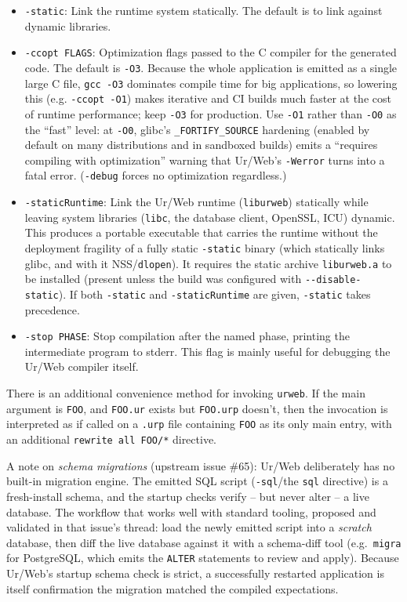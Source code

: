 \documentclass{article}
\begin{document}
\begin{itemize}
\item \texttt{-static}: Link the runtime system statically.  The default is to link against dynamic libraries.

\item \texttt{-ccopt FLAGS}: Optimization flags passed to the C compiler for the generated code.  The default is \texttt{-O3}.  Because the whole application is emitted as a single large C file, \texttt{gcc -O3} dominates compile time for big applications, so lowering this (e.g. \texttt{-ccopt -O1}) makes iterative and CI builds much faster at the cost of runtime performance; keep \texttt{-O3} for production.  Use \texttt{-O1} rather than \texttt{-O0} as the ``fast'' level: at \texttt{-O0}, glibc's \texttt{\_FORTIFY\_SOURCE} hardening (enabled by default on many distributions and in sandboxed builds) emits a ``requires compiling with optimization'' warning that Ur/Web's \texttt{-Werror} turns into a fatal error.  (\texttt{-debug} forces no optimization regardless.)
\item \texttt{-staticRuntime}: Link the Ur/Web runtime (\texttt{liburweb}) statically while leaving system libraries (\texttt{libc}, the database client, OpenSSL, ICU) dynamic.  This produces a portable executable that carries the runtime without the deployment fragility of a fully static \texttt{-static} binary (which statically links glibc, and with it NSS/\texttt{dlopen}).  It requires the static archive \texttt{liburweb.a} to be installed (present unless the build was configured with \texttt{-{}-disable-static}).  If both \texttt{-static} and \texttt{-staticRuntime} are given, \texttt{-static} takes precedence.

\item \texttt{-stop PHASE}: Stop compilation after the named phase, printing the intermediate program to stderr.  This flag is mainly useful for debugging the Ur/Web compiler itself.
\end{itemize}

There is an additional convenience method for invoking \texttt{urweb}.  If the main argument is \texttt{FOO}, and \texttt{FOO.ur} exists but \texttt{FOO.urp} doesn't, then the invocation is interpreted as if called on a \texttt{.urp} file containing \texttt{FOO} as its only main entry, with an additional \texttt{rewrite all FOO/*} directive.

A note on \emph{schema migrations} (upstream issue \#65): Ur/Web deliberately has no built-in migration engine.  The emitted SQL script (\texttt{-sql}/the \texttt{sql} directive) is a fresh-install schema, and the startup checks verify -- but never alter -- a live database.  The workflow that works well with standard tooling, proposed and validated in that issue's thread: load the newly emitted script into a \emph{scratch} database, then diff the live database against it with a schema-diff tool (e.g.\ \texttt{migra} for PostgreSQL, which emits the \texttt{ALTER} statements to review and apply).  Because Ur/Web's startup schema check is strict, a successfully restarted application is itself confirmation the migration matched the compiled expectations.
\end{document}
